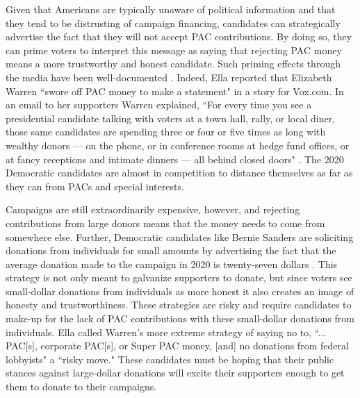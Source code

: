 \documentclass[12pt]{article}
\begin{document}
 Given that Americans are typically unaware of political information and that they tend to be distrusting of campaign financing, candidates can strategically advertise the fact that they will not accept PAC contributions. By doing so, they can prime voters to interpret this message as saying that rejecting PAC money means a more trustworthy and honest candidate. Such priming effects through the media have been well-documented \citep{iyengar_news_1989}. Indeed, Ella \citet{nilsen_race_2019} reported that Elizabeth Warren ``swore off PAC money to make a statement" in a story for Vox.com. In an email to her supporters Warren explained, ``For every time you see a presidential candidate talking with voters at a town hall, rally, or local diner, those same candidates are spending three or four or five times as long with wealthy donors — on the phone, or in conference rooms at hedge fund offices, or at fancy receptions and intimate dinners — all behind closed doors" \citep{nilsen_race_2019}. The 2020 Democratic candidates are almost in competition to distance themselves as far as they can from PACs and special interests. 
 
 Campaigns are still extraordinarily expensive, however, and rejecting contributions from large donors means that the money needs to come from somewhere else. Further, Democratic candidates like Bernie Sanders are soliciting donations from individuals for small amounts by advertising the fact that the average donation made to the campaign in 2020 is twenty-seven dollars \citep{gambino_not_2019}. This strategy is not only meant to galvanize supporters to donate, but since voters see small-dollar donations from individuals as more honest \citep{bowler_campaign_2016} it also creates an image of honesty and trustworthiness. These strategies are risky and require candidates to make-up for the lack of PAC contributions with these small-dollar donations from individuals. Ella \citet{nilsen_race_2019} called Warren's more extreme strategy of saying no to, ``... PAC[s], corporate PAC[s], or Super PAC money, [and] no donations from federal lobbyists" a ``risky move." These candidates must be hoping that their public stances against large-dollar donations will excite their supporters enough to get them to donate to their campaigns.





\pagebreak
{}
%
\printbibliography
\pagebreak


\begin{appendices}



\end{appendices}
\end{document}
